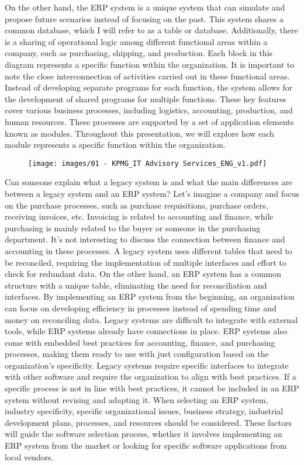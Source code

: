 On the other hand, the ERP system is a
unique system that can simulate and propose future scenarios instead of
focusing on the past. This system shares a common database, which I will
refer to as a table or database. Additionally, there is a sharing of
operational logic among different functional areas within a company,
such as purchasing, shipping, and production. Each block in this diagram
represents a specific function within the organization. It is important
to note the close interconnection of activities carried out in these
functional areas. Instead of developing separate programs for each
function, the system allows for the development of shared programs for
multiple functions. These key features cover various business processes,
including logistics, accounting, production, and human resources. These
processes are supported by a set of application elements known as
modules. Throughout this presentation, we will explore how each module
represents a specific function within the organization.

\begin{figure}[!h]
  \centering
  \texttt{[image: images/01 - KPMG\_IT Advisory Services\_ENG\_v1.pdf]}
\end{figure}

Can someone explain what a legacy system is and what the main
differences are between a legacy system and an ERP system? Let's imagine a
company and focus on the purchase processes, such as purchase
requisitions, purchase orders, receiving invoices, etc. Invoicing is
related to accounting and finance, while purchasing is mainly related to
the buyer or someone in the purchasing department. It's not interesting
to discuss the connection between finance and accounting in these
processes. A legacy system uses different tables that need to be
reconciled, requiring the implementation of multiple interfaces and
effort to check for redundant data. On the other hand, an ERP system has
a common structure with a unique table, eliminating the need for
reconciliation and interfaces. By implementing an ERP system from the
beginning, an organization can focus on developing efficiency in
processes instead of spending time and money on reconciling data. Legacy
systems are difficult to integrate with external tools, while ERP
systems already have connections in place. ERP systems also come with
embedded best practices for accounting, finance, and purchasing
processes, making them ready to use with just configuration based on the
organization's specificity. Legacy systems require specific interfaces
to integrate with other software and require the organization to align
with best practices. If a specific process is not in line with best
practices, it cannot be included in an ERP system without revising and
adapting it. When selecting an ERP system, industry specificity,
specific organizational issues, business strategy, industrial
development plans, processes, and resources should be considered. These
factors will guide the software selection process, whether it involves
implementing an ERP system from the market or looking for specific
software applications from local vendors.

